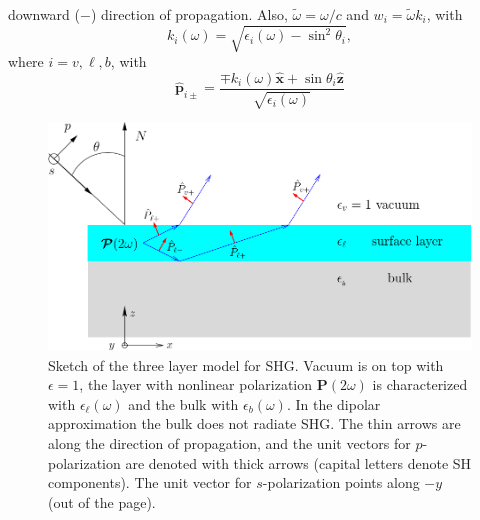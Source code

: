 downward ($-$) direction of propagation. Also, $\tilde\omega=\omega/c$ and
$w_i=\tilde\omega k_i$, with
\begin{equation*}\label{r3}
k_i(\omega)=\sqrt{\epsilon_i(\omega) - \sin^2\theta_i},
\end{equation*}
where $i=v,\ell,b$, with
\begin{equation*}\label{r4}
\hat{\mathbf{p}}_{i\pm} =
\frac{\mp k_i(\omega)\hat{\mathbf{x}} + \sin\theta_i\hat{\mathbf{z}}}
{\sqrt{\epsilon_i(\omega)}}
\end{equation*}
\begin{figure}[t]
\centering
\includegraphics[scale=.5]{content/figures/diag-3layer}
\caption{Sketch of the three layer model for SHG. Vacuum is on top with
$\epsilon=1$, the layer with nonlinear polarization $\mathbf{P}(2\omega)$ is
characterized with $\epsilon_{\ell}(\omega)$ and the bulk with
$\epsilon_{b}(\omega)$. In the dipolar approximation the bulk does not radiate
SHG. The thin arrows are along the direction of propagation, and the unit
vectors for $p$-polarization are denoted with thick arrows (capital letters
denote SH components). The unit vector for $s$-polarization points along $-y$
(out of the page).}
\label{3layer}
\end{figure}

